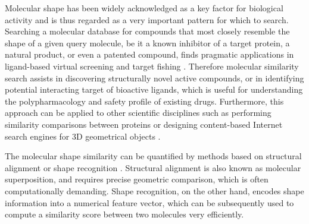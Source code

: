 Molecular shape has been widely acknowledged as a key factor for biological activity and is thus regarded as a very important pattern for which to search. Searching a molecular database for compounds that most closely resemble the shape of a given query molecule, be it a known inhibitor of a target protein, a natural product, or even a patented compound, finds pragmatic applications in ligand-based virtual screening \citep{1332,1380,1281,1504,1502,1615} and target fishing \citep{1528,1407,1408,1402}. Therefore molecular similarity search assists in discovering structurally novel active compounds, or in identifying potential interacting target of bioactive ligands, which is useful for understanding the polypharmacology and safety profile of existing drugs. Furthermore, this approach can be applied to other scientific disciplines such as performing similarity comparisons between proteins or designing content-based Internet search engines for 3D geometrical objects \citep{1280}.

The molecular shape similarity can be quantified by methods based on structural alignment \citep{1440,887,1439,1534} or shape recognition \citep{1379,1338,1331}. Structural alignment is also known as molecular superposition, and requires precise geometric comparison, which is often computationally demanding. Shape recognition, on the other hand, encodes shape information into a numerical feature vector, which can be subsequently used to compute a similarity score between two molecules very efficiently.

